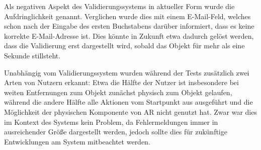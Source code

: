 \medskip

Als negativen Aspekt des Validierungssystems in aktueller Form wurde die Aufdringlichkeit genannt. Verglichen wurde dies mit einem E-Mail-Feld, welches schon nach der Eingabe des ersten Buchstabens darüber informiert, dass es keine korrekte E-Mail-Adresse ist. Dies könnte in Zukunft etwa dadurch gelöst werden, dass die Validierung erst dargestellt wird, sobald das Objekt für mehr als eine Sekunde stillsteht.

\medskip

Unabhängig vom Validierungssystem wurden während der Tests zusätzlich zwei Arten von Nutzern erkannt: Etwa die Hälfte der Nutzer ist insbesondere bei weiten Entfernungen zum Objekt zunächst physisch zum Objekt gelaufen, während die andere Hälfte alle Aktionen vom Startpunkt aus ausgeführt und die Möglichkeit der physischen Komponente von AR nicht genutzt hat. Zwar war dies im Kontext des Systems kein Problem, da Fehlermeldungen immer in ausreichender Größe dargestellt werden, jedoch sollte dies für zukünftige Entwicklungen am System mitbeachtet werden.